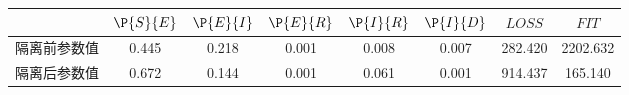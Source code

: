\begin{tabular}{cccccccc}
\hline
&$\P{S}{E}$&$\P{E}{I}$&$\P{E}{R}$&$\P{I}{R}$&$\P{I}{D}$&$LOSS$&$FIT$\\
\hline
隔离前参数值&0.445&0.218&0.001&0.008&0.007&282.420&2202.632\\
隔离后参数值&0.672&0.144&0.001&0.061&0.001&914.437&165.140\\
\hline
\end{tabular}